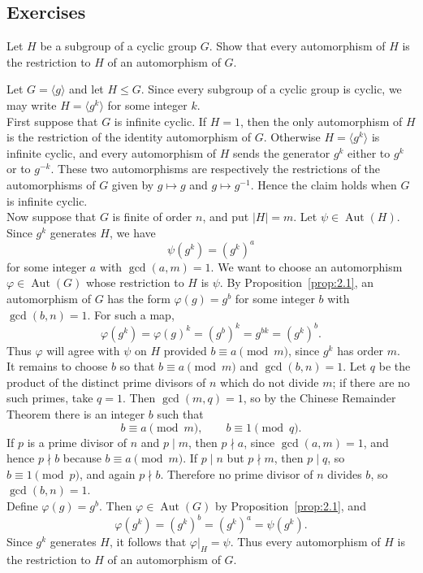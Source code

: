 \documentclass[../Odyssey_Project.tex]{subfiles}
\begin{document}
\subsection*{Exercises}

\begin{exercise}
\label{ex:2.1}
Let $H$ be a subgroup of a cyclic group $G$. Show that every automorphism of $H$ is the restriction to $H$ of an automorphism of $G$.
\end{exercise}
\begin{solution}
    Let $G = \langle g \rangle$ and let $H \leq G$. Since every subgroup of a cyclic group is cyclic, we may write $H = \langle g^k \rangle$ for some integer $k$. \\
    First suppose that $G$ is infinite cyclic. If $H = 1$, then the only automorphism of $H$ is the restriction of the identity automorphism of $G$. Otherwise $H = \langle g^k \rangle$ is infinite cyclic, and every automorphism of $H$ sends the generator $g^k$ either to $g^k$ or to $g^{-k}$. These two automorphisms are respectively the restrictions of the automorphisms of $G$ given by $g \mapsto g$ and $g \mapsto g^{-1}$. Hence the claim holds when $G$ is infinite cyclic. \\
    Now suppose that $G$ is finite of order $n$, and put $\lvert H \rvert = m$. Let $\psi \in \operatorname{Aut}(H)$. Since $g^k$ generates $H$, we have
    \[
        \psi(g^k) = (g^k)^a
    \]
    for some integer $a$ with $\gcd(a,m) = 1$. We want to choose an automorphism $\varphi \in \operatorname{Aut}(G)$ whose restriction to $H$ is $\psi$. By Proposition~\ref{prop:2.1}, an automorphism of $G$ has the form $\varphi(g) = g^b$ for some integer $b$ with $\gcd(b,n) = 1$. For such a map,
    \[
        \varphi(g^k) = \varphi(g)^k = (g^b)^k = g^{bk} = (g^k)^b.
    \]
    Thus $\varphi$ will agree with $\psi$ on $H$ provided $b \equiv a \pmod{m}$, since $g^k$ has order $m$. \\
    It remains to choose $b$ so that $b \equiv a \pmod{m}$ and $\gcd(b,n) = 1$. Let $q$ be the product of the distinct prime divisors of $n$ which do not divide $m$; if there are no such primes, take $q = 1$. Then $\gcd(m,q) = 1$, so by the Chinese Remainder Theorem there is an integer $b$ such that
    \[
        b \equiv a \pmod{m},
        \qquad
        b \equiv 1 \pmod{q}.
    \]
    If $p$ is a prime divisor of $n$ and $p \mid m$, then $p \nmid a$, since $\gcd(a,m) = 1$, and hence $p \nmid b$ because $b \equiv a \pmod{m}$. If $p \mid n$ but $p \nmid m$, then $p \mid q$, so $b \equiv 1 \pmod{p}$, and again $p \nmid b$. Therefore no prime divisor of $n$ divides $b$, so $\gcd(b,n) = 1$. \\
    Define $\varphi(g) = g^b$. Then $\varphi \in \operatorname{Aut}(G)$ by Proposition~\ref{prop:2.1}, and
    \[
        \varphi(g^k) = (g^k)^b = (g^k)^a = \psi(g^k).
    \]
    Since $g^k$ generates $H$, it follows that $\varphi|_H = \psi$. Thus every automorphism of $H$ is the restriction to $H$ of an automorphism of $G$.
\end{solution}
\end{document}
